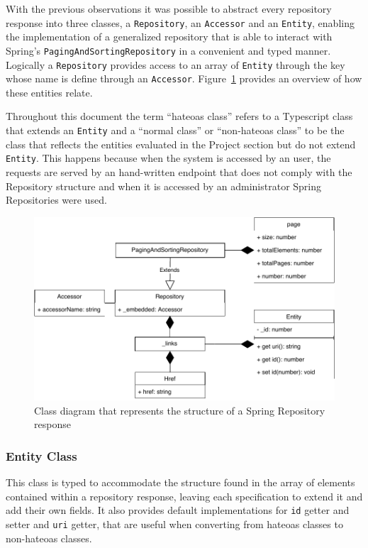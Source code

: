 With the previous observations it was possible to abstract every repository response into three classes, a \texttt{Repository}, an \texttt{Accessor} and an \texttt{Entity}, enabling the implementation of a generalized repository that is able to interact with Spring's \texttt{PagingAndSortingRepository} in a convenient and typed manner.
Logically a \texttt{Repository} provides access to an array of \texttt{Entity} through the key whose name is define through an \texttt{Accessor}. Figure~\ref{fig:springresponse} provides an overview of how these entities relate.

Throughout this document the term ``hateoas class'' refers to a Typescript class that extends an \texttt{Entity} and a ``normal class'' or ``non-hateoas class'' to be the class that reflects the entities evaluated in the Project section but do not extend \texttt{Entity}. This happens because when the system is accessed by an user, the requests are served by an hand-written endpoint that does not comply with the Repository structure and when it is accessed by an administrator Spring Repositories were used.

\begin{figure}
  \centering
  \includegraphics[width=.8\textwidth]{images/diagramas/hateoas_diagram}
  \caption{Class diagram that represents the structure of a Spring Repository response}\label{fig:springresponse}
\end{figure}



\subsubsection{Entity Class}
This class is typed to accommodate the structure found in the array of elements contained within a repository response, leaving each specification to extend it and add their own fields. It also provides default implementations for \texttt{id} getter and setter and \texttt{uri} getter, that are useful when converting from hateoas classes to non-hateoas classes.

